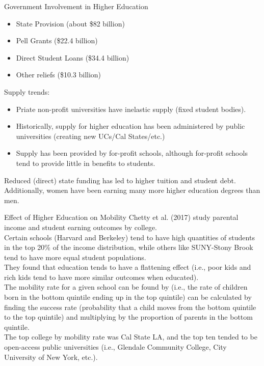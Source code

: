 \documentclass[10pt]{extarticle}
\begin{document}
  \begin{problem}{Government Involvement in Higher Education}
    \begin{itemize}
      \item State Provision (about \$82 billion)
      \item Pell Grants (\$22.4 billion)
      \item Direct Student Loans (\$34.4 billion)
      \item Other reliefs (\$10.3 billion)
    \end{itemize}
    Supply trends:
    \begin{itemize}
      \item Priate non-profit universities have inelastic supply (fixed student bodies).
      \item Historically, supply for higher education has been administered by public universities (creating new UCs/Cal States/etc.)
      \item Supply has been provided by for-profit schools, although for-profit schools tend to provide little in benefits to students.
    \end{itemize}
    Reduced (direct) state funding has led to higher tuition and student debt.\\

    Additionally, women have been earning many more higher education degrees than men.\\
    \begin{problem}{Effect of Higher Education on Mobility}
      Chetty et al. (2017) study parental income and student earning outcomes by college.\\

      Certain schools (Harvard and Berkeley) tend to have high quantities of students in the top 20\% of the income distribution, while others like SUNY-Stony Brook tend to have more equal student populations.\\

      They found that education tends to have a flattening effect (i.e., poor kids and rich kids tend to have more similar outcomes when educated).\\

      The mobility rate for a given school can be found by (i.e., the rate of children born in the bottom quintile ending up in the top quintile) can be calculated by finding the success rate (probability that a child moves from the bottom quintile to the top quintile) and multiplying by the proportion of parents in the bottom quintile.\\

      The top college by mobility rate was Cal State LA, and the top ten tended to be open-access public universities (i.e., Glendale Community College, City University of New York, etc.).
    \end{problem}
  \end{problem}
\end{document}
